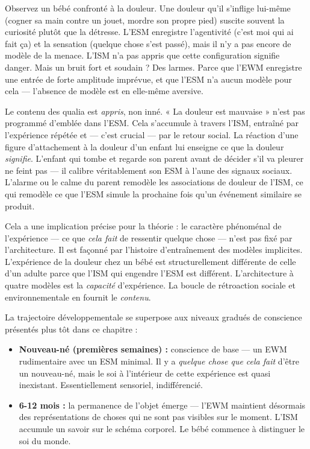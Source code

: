 \documentclass[11pt, twoside, openright]{book}
\begin{document}
Observez un bébé confronté à la douleur. Une douleur qu'il s'inflige lui-même (cogner sa main contre un jouet, mordre son propre pied) suscite souvent la curiosité plutôt que la détresse. L'ESM enregistre l'agentivité (c'est moi qui ai fait ça) et la sensation (quelque chose s'est passé), mais il n'y a pas encore de modèle de la menace. L'ISM n'a pas appris que cette configuration signifie danger. Mais un bruit fort et soudain ? Des larmes. Parce que l'EWM enregistre une entrée de forte amplitude imprévue, et que l'ESM n'a aucun modèle pour cela --- l'absence de modèle est en elle-même aversive.

Le contenu des qualia est \textit{appris}, non inné. « La douleur est mauvaise » n'est pas programmé d'emblée dans l'ESM. Cela s'accumule à travers l'ISM, entraîné par l'expérience répétée et --- c'est crucial --- par le retour social. La réaction d'une figure d'attachement à la douleur d'un enfant lui enseigne ce que la douleur \textit{signifie}. L'enfant qui tombe et regarde son parent avant de décider s'il va pleurer ne feint pas --- il calibre véritablement son ESM à l'aune des signaux sociaux. L'alarme ou le calme du parent remodèle les associations de douleur de l'ISM, ce qui remodèle ce que l'ESM simule la prochaine fois qu'un événement similaire se produit.

Cela a une implication précise pour la théorie : le caractère phénoménal de l'expérience --- ce que \textit{cela fait} de ressentir quelque chose --- n'est pas fixé par l'architecture. Il est façonné par l'histoire d'entraînement des modèles implicites. L'expérience de la douleur chez un bébé est structurellement différente de celle d'un adulte parce que l'ISM qui engendre l'ESM est différent. L'architecture à quatre modèles est la \textit{capacité} d'expérience. La boucle de rétroaction sociale et environnementale en fournit le \textit{contenu}.

La trajectoire développementale se superpose aux niveaux gradués de conscience présentés plus tôt dans ce chapitre :

\begin{itemize}
  \item \textbf{Nouveau-né (premières semaines) :} conscience de base --- un EWM rudimentaire avec un ESM minimal. Il y a \textit{quelque chose que cela fait} d'être un nouveau-né, mais le soi à l'intérieur de cette expérience est quasi inexistant. Essentiellement sensoriel, indifférencié.
\end{itemize}

\begin{itemize}
  \item \textbf{6-12 mois :} la permanence de l'objet émerge --- l'EWM maintient désormais des représentations de choses qui ne sont pas visibles sur le moment. L'ISM accumule un savoir sur le schéma corporel. Le bébé commence à distinguer le soi du monde.
\end{itemize}
\end{document}
